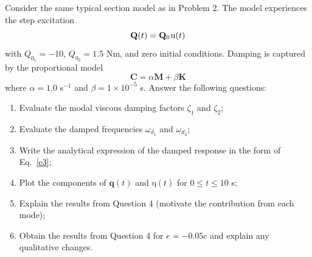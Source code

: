 \documentclass[11pt,a4paper]{article}
\begin{document}
Consider the same typical section model as in Problem 2. The model experiences the step excitation
%
\begin{equation}
	\mathbf{Q}(t) = 
	\mathbf{Q}_0 \hspace{0.25mm}
	\mathrm{u}(t)
\end{equation}
%
with $Q_{0_1} = -10$, $Q_{0_2} = 1.5$ Nm, and zero initial conditions. Damping is captured by the proportional model
%
\begin{equation}
	\mathbf{C} = \alpha \mathbf{M} + \beta \mathbf{K}
\end{equation}
%
where $\alpha = 1.0$ s$^{-1}$ and $\beta = 1 \times 10^{-5}$ s. Answer the following questions:
%
\begin{enumerate}
	\item Evaluate the modal viscous damping factors $\zeta_1$ and $\zeta_2$;
	\item Evaluate the damped frequencies $\omega_{d_1}$ and $\omega_{d_2}$;
	\item Write the analytical expression of the damped response in the form of Eq.~\ref{e3};
	\item Plot the components of $\mathbf{q}(t)$ and $\bm{\mathrm{\eta}}(t)$ for $0 \le t \le 10$ s;
	\item Explain the results from Question 4 (motivate the contribution from each mode);
	\item Obtain the results from Question 4 for $e=-0.05c$ and explain any qualitative changes.
\end{enumerate}
\end{document}
